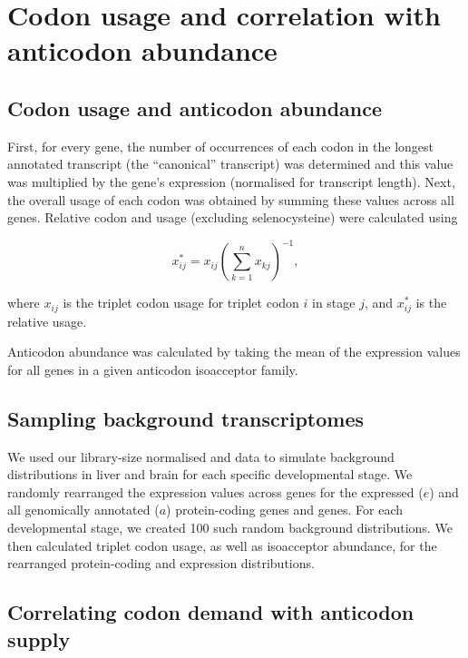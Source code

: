 \section{Codon usage and correlation with anticodon abundance}

\subsection{Codon usage and anticodon abundance}

First, for every gene, the number of occurrences of each codon in the longest
annotated transcript (the “canonical” transcript) was determined and this value
was multiplied by the gene’s expression (normalised for transcript length).
Next, the overall usage of each codon was obtained by summing these values
across all genes. Relative codon and usage (excluding selenocysteine) were
calculated using

\begin{equation}
    x_{ij}^* = x_{ij}\left(\sum_{k=1}^n x_{kj}\right)^{-1},
\end{equation}

where \(x_{ij}\) is the triplet codon usage for triplet codon \(i\) in stage
\(j\), and \(x_{ij}^*\) is the relative usage.

Anticodon abundance was calculated by taking the mean of the expression values
for all \trna genes in a given anticodon isoacceptor family.

\subsection{Sampling background transcriptomes}

We used our library-size normalised \rnaseq and  \chipseq data to simulate
background distributions in liver and brain for each specific developmental
stage. We randomly rearranged the expression values across genes for the
expressed (\(e\)) and all genomically annotated (\(a\)) protein-coding genes and
\trna genes. For each developmental stage, we created \num{100} such random
background distributions. We then calculated triplet codon usage, as well as
isoacceptor abundance, for the rearranged protein-coding \rna and \trna
expression distributions.

\subsection{Correlating codon demand with anticodon supply}

